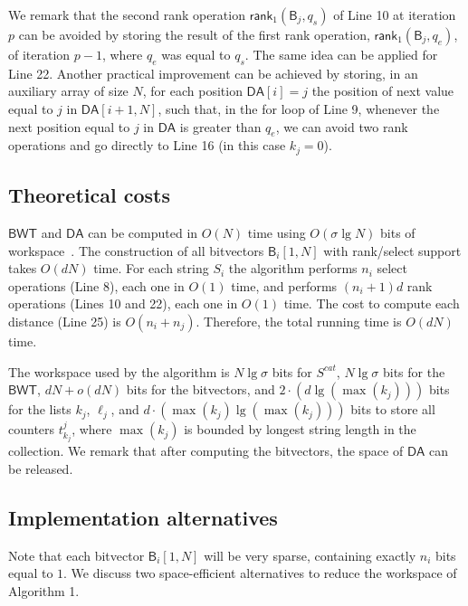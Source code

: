 \documentclass{elsarticle}
\newcommand{\rank}{\ensuremath{\mathsf{rank}}\xspace}
\newcommand{\DA}{\ensuremath{\mathsf{DA}}\xspace}
\newcommand{\BWT}{\ensuremath{\mathsf{BWT}}\xspace}
\newcommand{\BM}{\ensuremath{\mathsf{B}}\xspace}
\begin{document}
We remark that the second rank operation $\rank_1(\BM_j,q_s)$ of Line 10 at
iteration $p$ can be avoided by storing the result of the first rank operation,
$\rank_1(\BM_j,q_e)$, of iteration $p-1$, where $q_e$ was equal to
$q_s$.
The same idea can be applied for Line 22.
Another practical improvement can be achieved by storing, in an auxiliary
array of size $N$, for each position $\DA[i]=j$ the position of next value equal to
$j$ in $\DA[i+1,N]$, such that, in the for loop of Line 9, whenever the next position equal to
$j$ in \DA is greater than $q_e$, we can avoid two rank operations and go directly to
Line 16 (in this case $k_j=0$).

\subsection{Theoretical costs}

\BWT and \DA can be computed in $O(N)$ time using $O(\sigma \lg N)$ bits of
workspace~\cite{Louza2017c}.
The construction of all bitvectors $\BM_i[1,N]$ with rank/select support takes
$O(dN)$ time.  
For each string $S_i$ the algorithm performs $n_i$ select operations (Line 8),
each one in $O(1)$ time, and performs $(n_i+1) d$ rank operations (Lines 10 and
22), each one in $O(1)$ time.
The cost to compute each distance (Line 25) is $O(n_i+n_j)$.
Therefore, the total running time is $O(dN)$ time.

The workspace used by the algorithm is $N\lg\sigma$ bits for $S^{cat}$,
$N\lg\sigma$ bits for the \BWT,
$dN+o(dN)$ bits for the bitvectors, and
$2 \cdot (d \lg( \max(k_j)))$ bits for the lists $k_j$, $\ell_j$,
and $d \cdot (\max(k_j) \lg( \max(k_j)))$ bits to store all counters $t^{j}_{k_j}$, where
$\max(k_j)$ is bounded by longest string length in the collection.
We remark that after computing the bitvectors, the space of \DA can be released.


\subsection{Implementation alternatives}\label{s:alternatives1}

Note that each bitvector $\BM_i[1,N]$ will be very sparse, containing exactly
$n_i$ bits equal to $1$.
We discuss two space-efficient alternatives to reduce the workspace of Algorithm 1.
\end{document}
